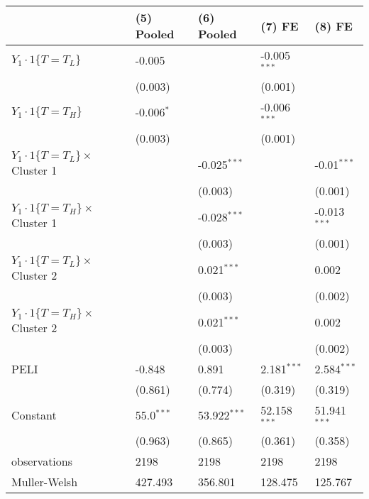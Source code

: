 \begin{tabular}{lllll}
\hline
 & (5) Pooled & (6) Pooled & (7) FE & (8) FE \\
\hline
$Y_1\cdot1\{T=T_L\}$ & -0.005 &  & -0.005$^{***}$ &  \\
 & (0.003) &  & (0.001) &  \\
$Y_1\cdot1\{T=T_H\}$ & -0.006$^{*}$ &  & -0.006$^{***}$ &  \\
 & (0.003) &  & (0.001) &  \\
$Y_1\cdot1\{T=T_L\}\times$ Cluster 1 &  & -0.025$^{***}$ &  & -0.01$^{***}$ \\
 &  & (0.003) &  & (0.001) \\
$Y_1\cdot1\{T=T_H\}\times$ Cluster 1 &  & -0.028$^{***}$ &  & -0.013$^{***}$ \\
 &  & (0.003) &  & (0.001) \\
$Y_1\cdot1\{T=T_L\}\times$ Cluster 2 &  & 0.021$^{***}$ &  & 0.002 \\
 &  & (0.003) &  & (0.002) \\
$Y_1\cdot1\{T=T_H\}\times$ Cluster 2 &  & 0.021$^{***}$ &  & 0.002 \\
 &  & (0.003) &  & (0.002) \\
PELI & -0.848 & 0.891 & 2.181$^{***}$ & 2.584$^{***}$ \\
 & (0.861) & (0.774) & (0.319) & (0.319) \\
Constant & 55.0$^{***}$ & 53.922$^{***}$ & 52.158$^{***}$ & 51.941$^{***}$ \\
 & (0.963) & (0.865) & (0.361) & (0.358) \\\hline

observations & 2198 & 2198 & 2198 & 2198 \\
Muller-Welsh & 427.493 & 356.801 & 128.475 & 125.767 \\
\hline
\end{tabular}
